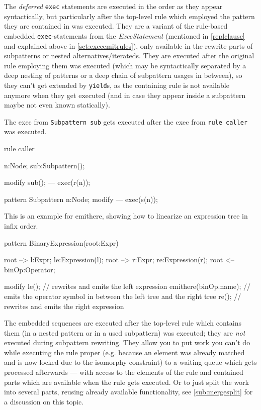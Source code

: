 The \emph{deferred} \texttt{exec} statements are executed in the order as they appear syntactically, but particularly after the top-level rule which employed the pattern they are contained in was executed.
They are a variant of the rule-based embedded \texttt{exec}-statements from the \emph{ExecStatement} (mentioned in \ref{replclause} and explained above in \ref{sct:execemitrules}), only available in the rewrite parts of subpatterns or nested alternatives/iterateds.
They are executed after the original rule employing them was executed (which may be syntactically separated by a deep nesting of patterns or a deep chain of subpattern usages in between),
so they can't get extended by \texttt{yield}s,
as the containing rule is not available anymore when they get executed (and in case they appear inside a subpattern maybe not even known statically).

\begin{example}
	The exec from \texttt{Subpattern sub} gets executed after the exec from \texttt{rule caller} was executed.
	\begin{grgen}
rule caller
{
  n:Node;
  sub:Subpattern();

  modify {
    sub();
  ---
    exec(r(n));
  }
}
pattern Subpattern
{
  n:Node;
  modify {
  ---
    exec(s(n));
  }
}
	\end{grgen}
\end{example}

\begin{example}
	This is an example for emithere, showing how to linearize an expression tree in infix order.
	\begin{grgen}
pattern BinaryExpression(root:Expr)
{
  root --> l:Expr; le:Expression(l);
  root --> r:Expr; re:Expression(r);
  root <-- binOp:Operator;

  modify {
    le(); // rewrites and emits the left expression
    emithere(binOp.name); // emits the operator symbol in between the left tree and the right tree
    re(); // rewrites and emits the right expression
  }
}
	\end{grgen}
\end{example}

\begin{note}
The embedded sequences are executed after the top-level rule which contains them (in a nested pattern or in a used subpattern) was executed; they are \emph{not} executed during subpattern rewriting.
They allow you to put work you can't do while executing the rule proper (e.g. because an element was already matched and is now locked due to the isomorphy constraint) to a waiting queue which gets processed afterwards --- with access to the elements of the rule and contained parts which are available when the rule gets executed.
Or to just split the work into several parts, reusing already available functionality, see \ref{sub:mergesplit} for a discussion on this topic.
\end{note}

